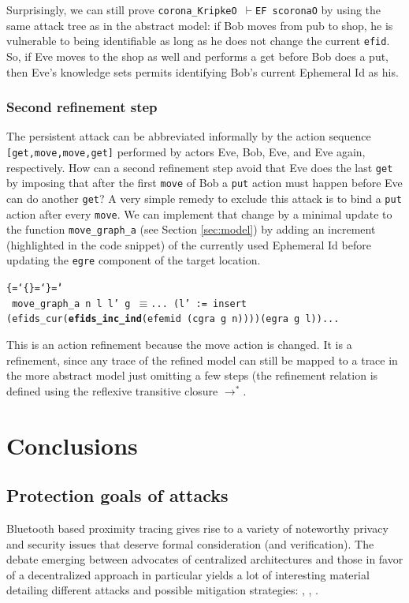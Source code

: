 \documentclass{llncs}
\newenvironment{ttbox}{\begin{alltt}\ttbraces\small\tt}%
                      {\end{alltt}}
\def\ttbraces{\let\.=\nobreak\chardef\{=`\{\chardef\}=`\}\chardef\|=`\\}
\newcommand\ttequiv{\mbox{{$\equiv$}}}
\newcommand\ttrelIstar{\mbox{{$\to^*$}}}
\newcommand\ttvdash{\mbox{{$\vdash$}}}
\begin{document}
Surprisingly, we can still prove \texttt{corona\_KripkeO \ttvdash EF scoronaO} by using the
same attack tree as in the abstract model: if Bob moves from pub to shop, he is vulnerable to
being identifiable as long as he does not change the current \texttt{efid}. So, if Eve moves to
the shop as well and performs a get before Bob does a put, then Eve's knowledge sets permits identifying
Bob's current Ephemeral Id as his.

\subsubsection{Second refinement step}
The persistent attack can be abbreviated informally by the action sequence \texttt{[get,move,move,get]}
performed by actors Eve, Bob, Eve, and Eve again, respectively.
How can a second refinement step avoid that Eve does the last \texttt{get} by imposing that after the
first \texttt{move} of Bob a \texttt{put} action must happen before Eve can do another \texttt{get}?
A very simple remedy to exclude this attack is to bind a \texttt{put} action after every \texttt{move}.
We can implement that change by a minimal update to the function \texttt{move\_graph\_a} (see Section \ref{sec:model})
by adding an increment (highlighted in the code snippet)
of the currently used Ephemeral Id before updating the \texttt{egre} component of the target location.
\begin{ttbox}
move\_graph\_a n l l' g \ttequiv ...
  (l' := insert (efids_cur({\bf efids\_inc\_ind}(efemid (cgra g n))))(egra g l))...
\end{ttbox}  
This is an action refinement because the move action is changed. It is a refinement, since
any trace of the refined model can still be mapped to a trace in the more abstract model just
omitting a few steps (the refinement relation is defined using the reflexive transitive closure
\texttt{\ttrelIstar}.


\section{Conclusions}
\label{sec:concl}
\subsection{Protection goals of attacks}
Bluetooth based proximity tracing gives rise to a variety of noteworthy privacy and security issues that deserve formal consideration (and verification). The debate emerging between advocates of centralized architectures and those in favor of a decentralized approach in particular yields a lot of interesting material detailing different attacks and possible mitigation strategies: \cite{pepppt:dp3tana}, \cite{pepppt:dp3tresp}, \cite{dp3t:psre}.
\end{document}
